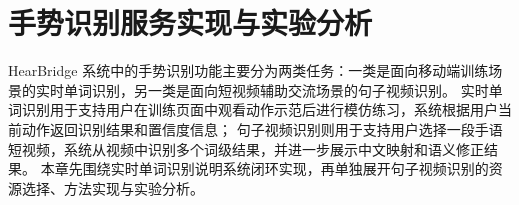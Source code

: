 \chapter{手势识别服务实现与实验分析}


\setlength{\tabcolsep}{3pt}
HearBridge 系统中的手势识别功能主要分为两类任务：一类是面向移动端训练场景的实时单词识别，另一类是面向短视频辅助交流场景的句子视频识别。
实时单词识别用于支持用户在训练页面中观看动作示范后进行模仿练习，系统根据用户当前动作返回识别结果和置信度信息；
句子视频识别则用于支持用户选择一段手语短视频，系统从视频中识别多个词级结果，并进一步展示中文映射和语义修正结果。
本章先围绕实时单词识别说明系统闭环实现，再单独展开句子视频识别的资源选择、方法实现与实验分析。









